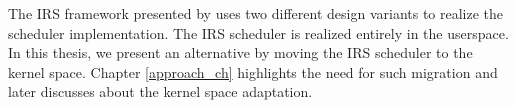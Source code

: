 The IRS framework presented by \citet{metzler2017quick} uses two different design variants to realize the scheduler implementation. 
The IRS scheduler is realized entirely in the userspace. 
In this thesis, we present an alternative by moving the IRS scheduler to the kernel space. 
Chapter \ref{approach_ch} highlights the need for such migration and later discusses about the kernel space adaptation. 


